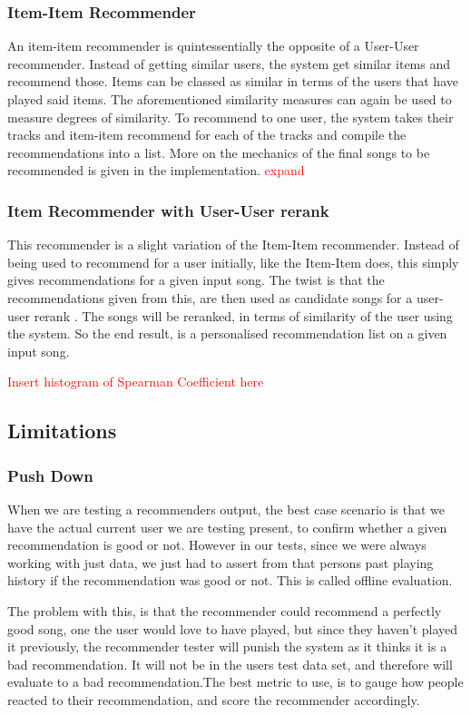 \documentclass[12pt]{article}
\newcommand\todo[1]{\textcolor{red}{#1}}
\begin{document}
		\subsubsection{Item-Item Recommender}
An item-item recommender is quintessentially the opposite of a User-User recommender. Instead of getting similar users, the system get similar items and recommend those. Items can be classed as similar in terms of the users that have played said items. The aforementioned similarity measures can again be used to measure degrees of similarity. To recommend to one user, the system takes their tracks and item-item recommend for each of the tracks and compile the recommendations into a list. More on the mechanics of the final songs to be recommended is given in the implementation. \todo{expand}
\subsubsection{Item Recommender with User-User rerank}
This recommender is a slight variation of the Item-Item recommender. Instead of being used to recommend for a user initially, like the Item-Item does, this simply gives recommendations for a given input song. The twist is that the recommendations given from this, are then used as candidate songs for a user-user rerank . The songs will be reranked, in terms of similarity of the user using the system. So the end result, is a personalised recommendation list on a given input song.

\todo{Insert histogram of Spearman Coefficient here}
		
		
	\subsection{Limitations}
		\subsubsection{Push Down}
		When we are testing a recommenders output, the best case scenario is that we have the actual current user we are testing present, to confirm whether a given recommendation is good or not. However in our tests, since we were always working with just data, we just had to assert from that persons past playing history if the recommendation was good or not. This is called offline evaluation. 
		
		The problem with this, is that the recommender could recommend a perfectly good song, one the user would love to have played, but since they haven't played it previously, the recommender tester will punish the system as it thinks it is a bad recommendation. It will not be in the users test data set, and therefore will evaluate to a bad recommendation.The best metric to use, is to gauge how people reacted to their recommendation, and score the recommender accordingly. 
		
\end{document}
